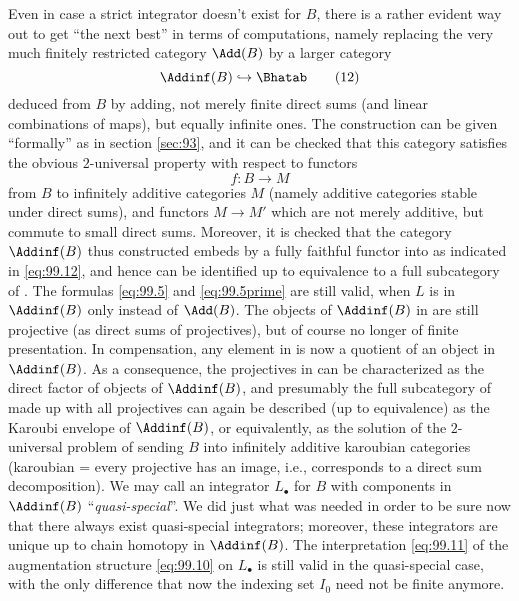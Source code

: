 Even in case a strict integrator doesn't exist for $B$, there is
a rather evident way out to get ``the next best'' in terms of
computations, namely replacing the very much finitely restricted
category $\Add(B)$ by a larger category
\begin{equation}
  \label{eq:99.12}
  \Addinf(B)\hookrightarrow \Bhatab\tag{12}
\end{equation}
deduced from $B$ by adding, not merely finite direct sums (and linear
combinations of maps), but equally infinite ones. The construction can
be given ``formally'' as in section \ref{sec:93}, and it can be
checked that this category satisfies the obvious $2$-universal
property with respect to functors
\[f:B\to M\]
from $B$ to infinitely additive categories $M$ (namely additive
categories stable under direct sums), and functors $M\to M'$ which are
not merely additive, but commute to small direct sums. Moreover, it is
checked that the category $\Addinf(B)$ thus constructed embeds by a
fully faithful functor into \Bhatab{} as indicated in
\eqref{eq:99.12}, and hence can be identified up to equivalence to a
full subcategory of \Bhatab. The formulas \eqref{eq:99.5} and
\eqref{eq:99.5prime} are still valid, when $L$ is in $\Addinf(B)$ only
instead of $\Add(B)$. The objects of $\Addinf(B)$ in \Bhatab{} are
still projective (as direct sums of projectives), but of course no
longer of finite presentation. In compensation, any element in
\Bhatab{} is now a quotient of an object in $\Addinf(B)$. As a
consequence, the projectives in \Bhatab{} can be characterized as the
direct factor of objects of $\Addinf(B)$, and presumably the full
subcategory of \Bhatab{} made up with all projectives can again be
described (up to equivalence) as the Karoubi envelope of $\Addinf(B)$,
or equivalently, as the solution of the $2$-universal problem of
sending $B$ into infinitely additive karoubian categories (karoubian =
every projective has an image, i.e., corresponds to a direct sum
decomposition). We may call an integrator $L_\bullet$ for $B$ with
components in $\Addinf(B)$ ``\emph{quasi-special}''. We did just what
was needed in order to be sure now that there always exist
quasi-special integrators; moreover, these integrators are unique up
to chain homotopy in $\Addinf(B)$. The interpretation \eqref{eq:99.11}
of the augmentation structure \eqref{eq:99.10} on $L_\bullet$ is still
valid in the quasi-special case, with the only difference that now the
indexing set $I_0$ need not be finite anymore.

\bigbreak

